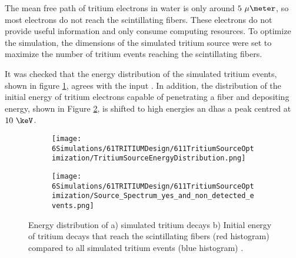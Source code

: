 The mean free path of tritium electrons in water is only around $5~\mu\meter$, so most electrons do not reach the scintillating fibers. These electrons do not provide useful information and only consume computing resources. To optimize the simulation, the dimensions of the simulated tritium source were set to maximize the number of tritium events reaching the scintillating fibers. 

It was checked that the energy distribution of the simulated tritium events, shown in figure \ref{subfig:EnergyDistributionTritiumSource}, agrees with the input \cite{TritiumEmissionSpectrum}. In addition, the distribution of the initial energy of tritium electrons capable of penetrating a fiber and depositing energy, shown in Figure \ref{subfig:EnergySpectrumEventsDetectedandNonDetected}, is shifted to high energies an dhas a peak centred at $10~\keV$. 

\begin{figure}
\centering
    \begin{subfigure}[b]{0.45\textwidth}
    \centering
    \texttt{[image: 6Simulations/61TRITIUMDesign/611TritiumSourceOptimization/TritiumSourceEnergyDistribution.png]}  
    \caption{\label{subfig:EnergyDistributionTritiumSource}}
    \end{subfigure}
    \hfill
    \begin{subfigure}[b]{0.45\textwidth}
    \centering
    \texttt{[image: 6Simulations/61TRITIUMDesign/611TritiumSourceOptimization/Source\_Spectrum\_yes\_and\_non\_detected\_events.png]}  
    \caption{\label{subfig:EnergySpectrumEventsDetectedandNonDetected}}
    \end{subfigure}
 \caption{Energy distribution of a) simulated tritium decays b) Initial energy of tritium decays that reach the scintillating fibers (red histogram) compared to all simulated tritium events (blue histogram) \cite{SimulationPaperCarlos}.
 \label{fig:TritiumSourceOptimization}}
\end{figure}

